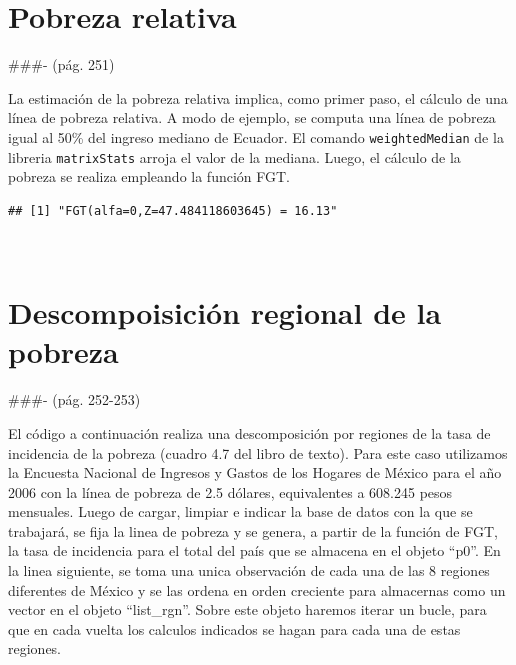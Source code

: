 \documentclass[
]{book}
\newenvironment{Shaded}{\begin{snugshade}}{\end{snugshade}}
\newcommand{\AttributeTok}[1]{\textcolor[rgb]{0.77,0.63,0.00}{#1}}
\newcommand{\CommentTok}[1]{\textcolor[rgb]{0.56,0.35,0.01}{\textit{#1}}}
\newcommand{\DecValTok}[1]{\textcolor[rgb]{0.00,0.00,0.81}{#1}}
\newcommand{\FloatTok}[1]{\textcolor[rgb]{0.00,0.00,0.81}{#1}}
\newcommand{\FunctionTok}[1]{\textcolor[rgb]{0.00,0.00,0.00}{#1}}
\newcommand{\NormalTok}[1]{#1}
\newcommand{\OtherTok}[1]{\textcolor[rgb]{0.56,0.35,0.01}{#1}}
\newcommand{\SpecialCharTok}[1]{\textcolor[rgb]{0.00,0.00,0.00}{#1}}
\newcommand{\StringTok}[1]{\textcolor[rgb]{0.31,0.60,0.02}{#1}}
\begin{document}
\hypertarget{pobreza-relativa}{%
\section{Pobreza relativa}\label{pobreza-relativa}}

\#\#\#- (pág. 251)

La estimación de la pobreza relativa implica, como primer paso, el cálculo de una línea de pobreza relativa. A modo de ejemplo, se computa una línea de pobreza igual al 50\% del ingreso mediano de Ecuador. El comando \texttt{weightedMedian} de la libreria \texttt{matrixStats} arroja el valor de la mediana. Luego, el cálculo de la pobreza se realiza empleando la función FGT.

\begin{Shaded}
\end{Shaded}

\begin{verbatim}
## [1] "FGT(alfa=0,Z=47.484118603645) = 16.13"
\end{verbatim}

~

\hypertarget{descompoisiciuxf3n-regional-de-la-pobreza}{%
\section{Descompoisición regional de la pobreza}\label{descompoisiciuxf3n-regional-de-la-pobreza}}

\#\#\#- (pág. 252-253)

El código a continuación realiza una descomposición por regiones de la tasa de incidencia de la pobreza (cuadro 4.7 del libro de texto). Para este caso utilizamos la Encuesta Nacional de Ingresos y Gastos de los Hogares de México para el año
2006 con la línea de pobreza de 2.5 dólares, equivalentes a 608.245 pesos mensuales.
Luego de cargar, limpiar e indicar la base de datos con la que se trabajará, se fija la linea de pobreza y se genera, a partir de la función de FGT, la tasa de incidencia para el total del país que se almacena en el objeto ``p0''. En la linea siguiente, se toma una unica observación de cada una de las 8 regiones diferentes de México y se las ordena en orden creciente para almacernas como un vector en el objeto ``list\_rgn''. Sobre este objeto haremos iterar un bucle, para que en cada vuelta los calculos indicados se hagan para cada una de estas regiones.
\end{document}
